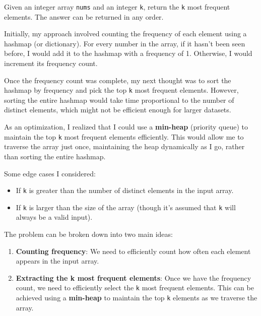 
\label{prob:lc-347-top-k-frequent-elements}

\ProblemSummary
Given an integer array \texttt{nums} and an integer \texttt{k}, return the \texttt{k} most frequent elements. The answer can be returned in any order.

\begin{Thinking}
Initially, my approach involved counting the frequency of each element using a hashmap (or dictionary). For every number in the array, if it hasn’t been seen before, I would add it to the hashmap with a frequency of 1. Otherwise, I would increment its frequency count.

Once the frequency count was complete, my next thought was to sort the hashmap by frequency and pick the top \texttt{k} most frequent elements. However, sorting the entire hashmap would take time proportional to the number of distinct elements, which might not be efficient enough for larger datasets.

As an optimization, I realized that I could use a \textbf{min-heap} (priority queue) to maintain the top \texttt{k} most frequent elements efficiently. This would allow me to traverse the array just once, maintaining the heap dynamically as I go, rather than sorting the entire hashmap.
\end{Thinking}

\EdgeCases
Some edge cases I considered:
\begin{itemize}
    \item If \texttt{k} is greater than the number of distinct elements in the input array.
    \item If \texttt{k} is larger than the size of the array (though it's assumed that \texttt{k} will always be a valid input).
\end{itemize}


\KeyIdea
The problem can be broken down into two main ideas:
\begin{enumerate}
    \item \textbf{Counting frequency}: We need to efficiently count how often each element appears in the input array.
    \item \textbf{Extracting the k most frequent elements}: Once we have the frequency count, we need to efficiently select the \texttt{k} most frequent elements. This can be achieved using a \textbf{min-heap} to maintain the top \texttt{k} elements as we traverse the array.
\end{enumerate}

